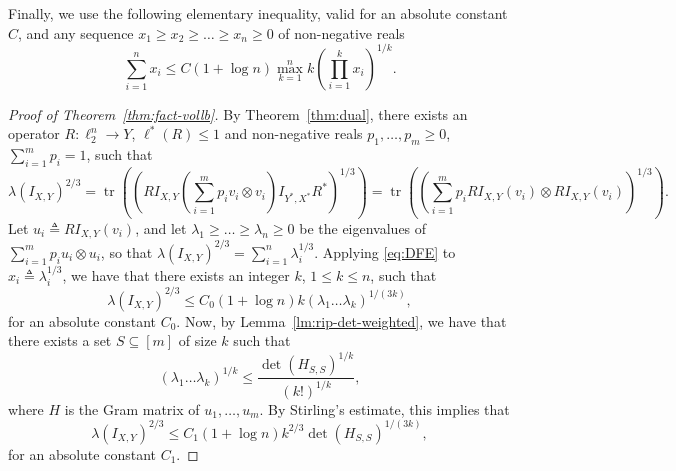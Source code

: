 \documentclass{article}
\newcommand{\eqdef}{\triangleq}
\DeclareMathOperator{\tr}{tr}
\begin{document}
Finally, we use the following elementary inequality, valid for an
absolute constant $C$, and any sequence $x_1 \ge x_2 \ge \ldots \ge
x_n \ge 0$ of non-negative reals
\begin{equation}
  \label{eq:DFE} %
  \sum_{i = 1}^n{x_i} \le C(1+\log n) 
  \max_{k = 1}^n k \left(\prod_{i = 1}^k{x_i}\right)^{1/k}.
\end{equation}

\begin{proof}[Proof of Theorem~\ref{thm:fact-vollb}]
  By Theorem~\ref{thm:dual}, there exists an operator $R: \ell_2^n \to
  Y$, $\ell^*(R) \le 1$ and non-negative reals $p_1, \ldots, p_m \ge
  0$, $\sum_{i = 1}^m{p_i} = 1$, such that 
  \[
  \lambda(I_{X,Y})^{2/3} 
  = \tr((RI_{X,Y}(\sum_{i = 1}^m{p_i v_i  \otimes  v_i})I_{Y^*,X^*}R^*)^{1/3})
  = \tr((\sum_{i = 1}^m{p_i RI_{X,Y}(v_i)  \otimes  RI_{X,Y}(v_i)})^{1/3}).
  \]
  Let $u_i \eqdef RI_{X,Y}(v_i)$, and let $\lambda_1 \ge \ldots \ge
  \lambda_n \ge 0$ be the eigenvalues of $\sum_{i = 1}^m{p_i u_i
    \otimes u_i}$, so that $\lambda(I_{X,Y})^{2/3} = \sum_{i =
    1}^n{\lambda_i^{1/3}}$. Applying \eqref{eq:DFE} to $x_i \eqdef
  \lambda_i^{1/3}$, we have that there exists an integer $k$, $1 \le k
  \le n$, such that
  \[
  \lambda(I_{X,Y})^{2/3} \le C_0 (1+\log n) k (\lambda_1 \ldots \lambda_k)^{1/(3k)},
  \]
  for an absolute constant $C_0$. Now, by
  Lemma~\ref{lm:rip-det-weighted}, we have that there exists a set $S
  \subseteq [m]$ of size $k$ such that
  \[
  (\lambda_1 \ldots \lambda_k)^{1/k} \le
  \frac{\det(H_{S,S})^{1/k}}{(k!)^{1/k}},
  \]
  where $H$ is the Gram matrix of $u_1, \ldots, u_m$. By Stirling's
  estimate, this implies that 
  \begin{equation}\label{eq:fact-det}
  \lambda(I_{X,Y})^{2/3} \le C_1 (1+\log n) k^{2/3} \det(H_{S,S})^{1/(3k)},
  \end{equation}
  for an absolute constant $C_1$. 


\end{proof}
\end{document}
